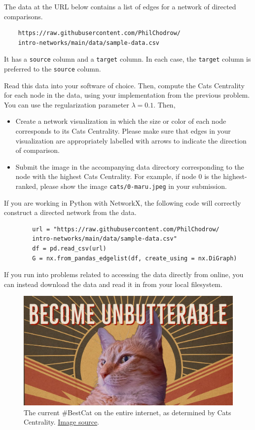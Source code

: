\documentclass{hw}
\begin{document}

The data at the URL below contains a list of edges for a network of directed comparisons. 
\begin{verbatim}
    https://raw.githubusercontent.com/PhilChodrow/
    intro-networks/main/data/sample-data.csv 
\end{verbatim}
It has a \texttt{source} column and a \texttt{target} column. 
In each case, the \texttt{target} column is preferred to the \texttt{source} column. 

Read this data into your software of choice. 
Then, compute the Cats Centrality for each node in the data, using your implementation from the previous problem. 
You can use the regularization parameter $\lambda = 0.1$. 
Then, 

\begin{itemize}
    \item Create a network visualization in which the size or color of each node corresponds to its Cats Centrality. 
    Please make sure that edges in your visualization are appropriately labelled with arrows to indicate the direction of comparison. 
    \item Submit the image in the accompanying data directory corresponding to the node with the highest Cats Centrality. 
    For example, if node $0$ is the highest-ranked, please show the image \texttt{cats/0-maru.jpeg} in your submission.   
\end{itemize}

\begin{hint}
    If you are working in Python with NetworkX, the following code will correctly construct a directed network from the data. 
    \begin{verbatim}
        url = "https://raw.githubusercontent.com/PhilChodrow/
        intro-networks/main/data/sample-data.csv"
        df = pd.read_csv(url)
        G = nx.from_pandas_edgelist(df, create_using = nx.DiGraph)
    \end{verbatim}
    If you run into problems related to accessing the data directly from online, you can instead download the data and read it in from your local filesystem. 
\end{hint}









\pagebreak 

\begin{figure}[h]
    \includegraphics[width=\textwidth]{img/unbutterable.jpeg}
    \caption{The current \#BestCat on the entire internet, as determined by Cats Centrality. \href{https://twitter.com/JortsTheCat/status/1509705795486724098?s=20&t=k_XvXEFp33ImE4xRyNAfcA}{Image source}.}
\end{figure}
\end{document}
